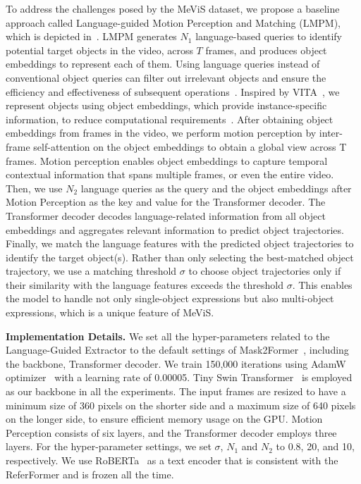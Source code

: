 \documentclass[10pt,twocolumn,letterpaper]{article}
\newcommand{\myparagraph}[1]{{\vspace{.5em} \noindent \bf #1}}
\newcommand{\ourdataset}{MeViS\xspace}
\newcommand{\ourmodel}{LMPM\xspace}
\begin{document}
\vspace{-0.5mm}
To address the challenges posed by the \ourdataset dataset, we propose a baseline approach called Language-guided Motion Perception and Matching (\ourmodel), which is depicted in~. \ourmodel generates $N_1$ language-based queries to identify potential target objects in the video, across $T$ frames, and produces object embeddings to represent each of them. Using language queries instead of conventional object queries can filter out irrelevant objects and ensure the efficiency and effectiveness of subsequent operations~\cite{ding2021vision,vltpami}. 
Inspired by VITA~\cite{VITA}, we represent objects using object embeddings, which provide instance-specific information, to reduce computational requirements~\cite{li2023transformer, li2023tube}. After obtaining object embeddings from frames in the video, we perform motion perception by inter-frame self-attention on the object embeddings to obtain a global view across T frames. Motion perception enables object embeddings to capture temporal contextual information that spans multiple frames, or even the entire video. Then, we use $N_2$ language queries as the query and the object embeddings after Motion Perception as the key and value for the Transformer decoder. The Transformer decoder decodes language-related information from all object embeddings and aggregates relevant information to predict object trajectories. Finally, we match the language features with the predicted object trajectories to identify the target object(s). Rather than only selecting the best-matched object trajectory, we use a matching threshold $\sigma$ to choose object trajectories only if their similarity with the language features exceeds the threshold $\sigma$. This enables the model to handle not only single-object expressions but also multi-object expressions, which is a unique feature of \ourdataset.

\myparagraph{Implementation Details.} {We set all the hyper-parameters related to the Language-Guided Extractor to the default settings of Mask2Former~\cite{mask2former}, including the backbone, Transformer decoder. We train 150,000 iterations using AdamW optimizer~\cite{loshchilov2017adamw} with a learning rate of 0.00005.
Tiny Swin Transformer~\cite{liu2021swin} is employed as our backbone in all the experiments. The input frames are resized to have a minimum size of 360 pixels on the shorter side and a maximum size of 640 pixels on the longer side, to ensure efficient memory usage on the GPU.
 Motion Perception consists of six layers, and the Transformer decoder employs three layers. For the hyper-parameter settings, we set $\sigma$, $N_1$ and $N_2$ to 0.8, 20, and 10, respectively.
We use RoBERTa~\cite{liu2019roberta} as a text encoder that is consistent with the ReferFormer and is frozen all the time.}
\end{document}

